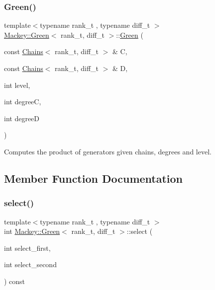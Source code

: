 \subsubsection{\texorpdfstring{Green()}{Green()}\hspace{0.1cm}{\footnotesize\ttfamily [2/2]}}
{\footnotesize\ttfamily template$<$typename rank\+\_\+t , typename diff\+\_\+t $>$ \\
\hyperlink{classMackey_1_1Green}{Mackey\+::\+Green}$<$ rank\+\_\+t, diff\+\_\+t $>$\+::\hyperlink{classMackey_1_1Green}{Green} (\begin{DoxyParamCaption}\item[{const \hyperlink{classMackey_1_1Chains}{Chains}$<$ rank\+\_\+t, diff\+\_\+t $>$ \&}]{C,  }\item[{const \hyperlink{classMackey_1_1Chains}{Chains}$<$ rank\+\_\+t, diff\+\_\+t $>$ \&}]{D,  }\item[{int}]{level,  }\item[{int}]{degreeC,  }\item[{int}]{degreeD }\end{DoxyParamCaption})}



Computes the product of generators given chains, degrees and level. 



\subsection{Member Function Documentation}
\mbox{\label{classMackey_1_1Green_a094a394ff8e1f4801fb3a5f09e071def}} 
\subsubsection{\texorpdfstring{select()}{select()}}
{\footnotesize\ttfamily template$<$typename rank\+\_\+t , typename diff\+\_\+t $>$ \\
int \hyperlink{classMackey_1_1Green}{Mackey\+::\+Green}$<$ rank\+\_\+t, diff\+\_\+t $>$\+::select (\begin{DoxyParamCaption}\item[{int}]{select\+\_\+first,  }\item[{int}]{select\+\_\+second }\end{DoxyParamCaption}) const}



